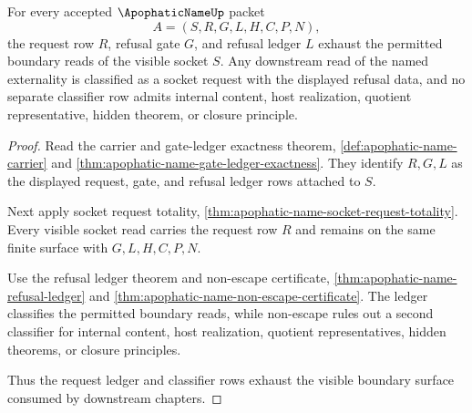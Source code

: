 \begin{theorem}
\label{thm:apophatic-name-request-ledger-classifier-exhaustion}
For every accepted $\ApophaticNameUp$ packet
$$
A=(S,R,G,L,H,C,P,N),
$$
the request row $R$, refusal gate $G$, and refusal ledger $L$ exhaust the permitted boundary reads of the visible socket $S$. Any downstream read of the named externality is classified as a socket request with the displayed refusal data, and no separate classifier row admits internal content, host realization, quotient representative, hidden theorem, or closure principle.
\end{theorem}
\begin{proof}
Read the carrier and gate-ledger exactness theorem, \autoref{def:apophatic-name-carrier} and \autoref{thm:apophatic-name-gate-ledger-exactness}. They identify $R,G,L$ as the displayed request, gate, and refusal ledger rows attached to $S$.

Next apply socket request totality, \autoref{thm:apophatic-name-socket-request-totality}. Every visible socket read carries the request row $R$ and remains on the same finite surface with $G,L,H,C,P,N$.

Use the refusal ledger theorem and non-escape certificate, \autoref{thm:apophatic-name-refusal-ledger} and \autoref{thm:apophatic-name-non-escape-certificate}. The ledger classifies the permitted boundary reads, while non-escape rules out a second classifier for internal content, host realization, quotient representatives, hidden theorems, or closure principles.

Thus the request ledger and classifier rows exhaust the visible boundary surface consumed by downstream chapters.
\end{proof}

